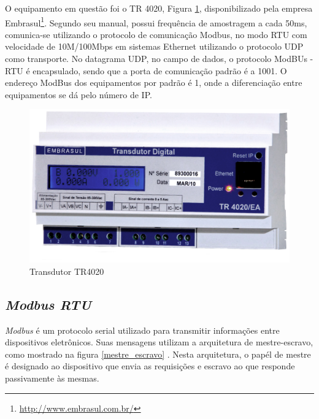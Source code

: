 O equipamento em questão foi o TR 4020, Figura \ref{tr4020}, disponibilizado pela empresa Embrasul\footnote{\url{http://www.embrasul.com.br/}}. Segundo seu manual, possui frequência de amostragem a cada 50ms, comunica-se utilizando o protocolo de comunicação Modbus, no modo RTU com velocidade de 10M/100Mbps em sistemas Ethernet utilizando o protocolo UDP como transporte. No datagrama UDP, no campo de dados, o protocolo ModBUs - RTU é encapsulado, sendo que a porta de comunicação padrão é a 1001. O endereço ModBus dos equipamentos por padrão é 1, onde a diferenciação entre equipamentos se dá pelo número de IP.

\begin{figure}[h]
    \centering
    \includegraphics[keepaspectratio=true,scale=0.5]{figuras/tr4020.eps}
    \caption{Transdutor TR4020}
    \label{tr4020}
\end{figure}

    \subsection{\textit{Modbus RTU}}

    \textit{Modbus} é um protocolo serial utilizado para transmitir informações entre dispositivos eletrônicos. Suas mensagens utilizam a arquitetura de mestre-escravo, como mostrado na figura \ref{mestre_escravo} \cite{modbus}. Nesta arquitetura, o papél de mestre é designado ao dispositivo que envia as requisições e escravo ao que responde passivamente às mesmas.

